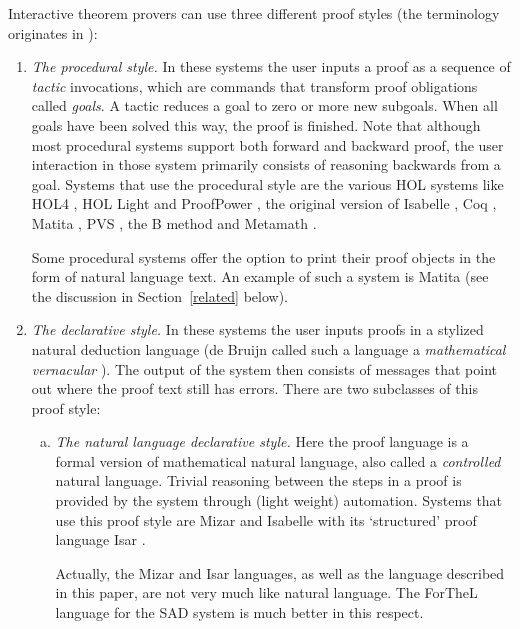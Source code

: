 \documentclass{LMCS}
\begin{document}
Interactive theorem provers can use three different proof styles
(the terminology originates in \cite{har:96:2}):
\begin{enumerate}[(1)]
\item
\emph{The procedural style.}
\label{item:procedural}
In these systems the user inputs a proof as a sequence of \emph{tactic} invocations, which
are commands that transform proof obligations called \emph{goals}.
A tactic reduces a goal to zero or more new subgoals.
When all goals have been solved this way, the proof is finished.
Note that although most procedural systems support both
forward and backward proof,
the {user interaction} in those system primarily consists of reasoning backwards from a goal.
Systems that use the procedural style are
the various HOL systems like HOL4 \cite{gor:mel:93}, HOL Light \cite{har:xx,har:00} and ProofPower \cite{lem:00}, the original version of Isabelle \cite{nip:pau:wen:02}, Coq \cite{coq:10}, Matita \cite{asp:coe:tas:zac:07}, PVS \cite{owr:rus:sha:92}, the B method \cite{abr:96} and Metamath \cite{meg:97}.

Some procedural systems offer the option to print their proof
objects in the form of natural language text.
An example of such a system is Matita (see the discussion in Section~\ref{related} below).
\smallskip

\item
\emph{The declarative style.}
\label{item:declarative}
In these systems the user inputs proofs in a stylized natural deduction language
(de Bruijn called such a language a \emph{mathematical vernacular} \cite{bru:87}).
The output of the system then consists of messages that point
out where the proof text still has errors.
There are two subclasses of this proof style:
\smallskip

\begin{enumerate}[(a)]
\item
\label{item:declarative:natlang}
\emph{The natural language declarative style.}
Here the proof language is a formal version of mathematical natural language,
also called a \emph{controlled} natural language.
Trivial reasoning between the steps in a proof is provided by the system through
(light weight) automation.
Systems that use this proof style are Mizar \cite{gra:kor:nau:10} and Isabelle with its `structured' proof language Isar \cite{wen:02,wen:02:1}.

Actually, the Mizar and Isar languages, as well as the language described in this paper, are not very much like natural language.
The ForTheL language for the SAD system \cite{pas:07} is much better in this respect.
\smallskip


\end{enumerate}
\end{enumerate}
\end{document}
